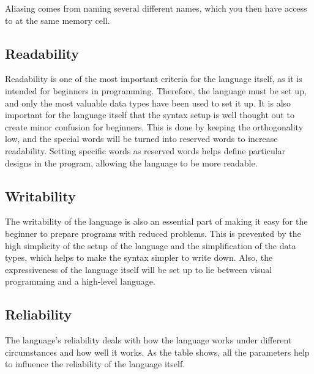 Aliasing comes from naming several different names, which you then have access to at the same memory cell.




\subsection{Readability}
Readability is one of the most important criteria for the language itself, as it is intended for beginners in programming. 
Therefore, the language must be set up, and only the most valuable data types have been used to set it up. It is also important for the language itself that the syntax setup is well thought out to create minor confusion for beginners.
 This is done by keeping the orthogonality low, and the special words will be turned into reserved words to increase readability. 
Setting specific words as reserved words helps define particular designs in the program, allowing the language to be more readable.

\subsection{Writability}

The writability of the language is also an essential part of making it easy for the beginner to prepare programs with reduced problems. 
This is prevented by the high simplicity of the setup of the language and the simplification of the data types, which helps to make the syntax simpler to write down.
 Also, the expressiveness of the language itself will be set up to lie between visual programming and a high-level language.

 \subsection{Reliability}
 The language's reliability deals with how the language works under different circumstances and how well it works. 
 As the table shows, all the parameters help to influence the reliability of the language itself.
